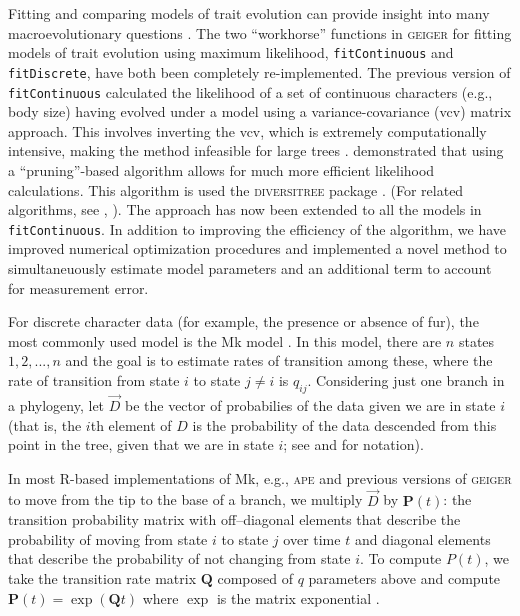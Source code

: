 Fitting and comparing  models of trait evolution can provide insight into many macroevolutionary questions \citep{PennellHarmon}. The two ``workhorse'' functions in \textsc{geiger} for fitting models of trait evolution using maximum likelihood, \texttt{fitContinuous} and \texttt{fitDiscrete}, have both been completely re-implemented. The previous version of \texttt{fitContinuous} calculated the likelihood of a set of continuous characters (e.g., body size) having evolved under a model using a variance-covariance (vcv) matrix approach. This involves inverting the vcv, which is extremely computationally intensive, making the method infeasible for large trees \citep{Hadfield2010, FitzJohn2012, Freckleton2012, Ho2014}. \citet{FitzJohn2012} demonstrated that using a ``pruning''-based algorithm \citep{Felsenstein1973} allows for much more efficient likelihood calculations. This algorithm is used the \textsc{diversitree} package \citep{FitzJohn2012}. (For related algorithms, see \citealt{Freckleton2012}, \citealt{Ho2014}). The approach has now been extended to all the models in \texttt{fitContinuous}. In addition to improving the efficiency of the algorithm, we have improved numerical optimization procedures and implemented a novel method to simultaneuously estimate model parameters and an additional term to account for measurement error.

For discrete character data (for example, the presence or absence of fur), the most commonly used model is the Mk model \citep{Pagel1994, Lewis2001}.  In this model, there are $n$ states $1, 2, ..., n$ and the goal is to estimate rates of
transition among these, where the rate of transition from state $i$ to
state $j \neq i$ is $q_{ij}$.  Considering just one branch in a
phylogeny, let $\vec D$ be the vector of probabilies of the data given
we are in state $i$ (that is, the $i$th element of $D$ is the
probability of the data descended from this point in the tree, given
that we are in state $i$; see \citet{Maddison2007} and \citet{FitzJohn2012}
for notation).

In most R-based implementations of Mk, e.g., \textsc{ape} \citep{ape}
and previous versions of \textsc{geiger} \citep{Harmon2008} to move from the
tip to the base of a branch, we multiply $\vec D$ by $\mathbf{P}(t)$: the
transition probability matrix with off--diagonal elements that describe
the probability of moving from state $i$ to state $j$ over time $t$
and diagonal elements that describe the probability of not changing
from state $i$.  To compute $P(t)$, we take the transition rate matrix
$\mathbf{Q}$ composed of $q$ parameters above and compute
$\mathbf{P}(t) = \exp(\mathbf{Q} t)$ where $\exp$ is the matrix
exponential \citep{Sidje-1998-130}.

